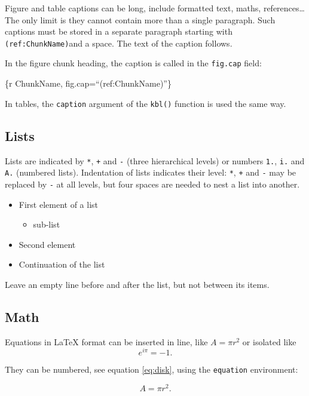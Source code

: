 \documentclass[fleqn,]{article} %
\providecommand{\tightlist}{%
  \setlength{\itemsep}{0pt}\setlength{\parskip}{0pt}}
\begin{document}
Figure and table captions can be long, include formatted text, maths, references\ldots{}
The only limit is they cannot contain more than a single paragraph.
Such captions must be stored in a separate paragraph starting with \texttt{(ref:ChunkName)}and a space.
The text of the caption follows.

In the figure chunk heading, the caption is called in the \texttt{fig.cap} field:

\{r ChunkName, fig.cap=\enquote{(ref:ChunkName)}\}

In tables, the \texttt{caption} argument of the \texttt{kbl()} function is used the same way.

\subsection{Lists}\label{lists}

Lists are indicated by \texttt{*}, \texttt{+} and \texttt{-} (three hierarchical levels) or numbers \texttt{1.}, \texttt{i.} and \texttt{A.} (numbered lists).
Indentation of lists indicates their level: \texttt{*}, \texttt{+} and \texttt{-} may be replaced by \texttt{-} at all levels, but four spaces are needed to nest a list into another.

\begin{itemize}
\tightlist
\item
  First element of a list

  \begin{itemize}
  \tightlist
  \item
    sub-list
  \end{itemize}
\item
  Second element
\item
  Continuation of the list
\end{itemize}

Leave an empty line before and after the list, but not between its items.

\subsection{Math}\label{math}

Equations in LaTeX format can be inserted in line, like \(A=\pi r^2\) or isolated like \[e^{i \pi} = -1.\]

They can be numbered, see equation \eqref{eq:disk}, using the \texttt{equation} environment:

\begin{equation}
  A = \pi r^2.
  \label{eq:disk}
\end{equation}
\end{document}
